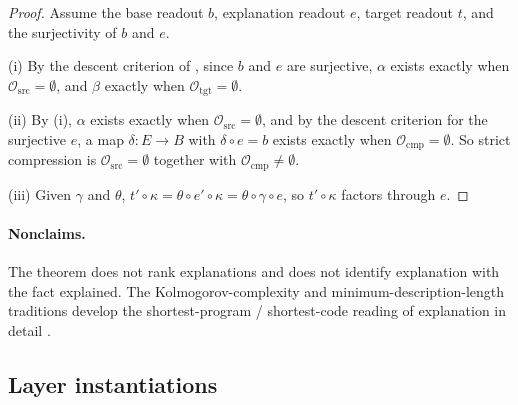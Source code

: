 \begin{proof}
Assume the base readout \(b\), explanation readout \(e\), target
readout \(t\), and the surjectivity of \(b\) and \(e\).

(i) By the descent criterion of , since \(b\) and
\(e\) are surjective, \(\alpha\) exists exactly when
\(\mathcal O_{\mathrm{src}}=\emptyset\), and \(\beta\) exactly when
\(\mathcal O_{\mathrm{tgt}}=\emptyset\).

(ii) By (i), \(\alpha\) exists exactly when
\(\mathcal O_{\mathrm{src}}=\emptyset\), and by the descent criterion for
the surjective \(e\), a map \(\delta:E\to B\) with \(\delta\circ e=b\)
exists exactly when \(\mathcal O_{\mathrm{cmp}}=\emptyset\).  So strict compression is
\(\mathcal O_{\mathrm{src}}=\emptyset\) together with
\(\mathcal O_{\mathrm{cmp}}\ne\emptyset\).

(iii) Given \(\gamma\) and \(\theta\),
\(t'\circ\kappa=\theta\circ e'\circ\kappa=\theta\circ\gamma\circ e\), so
\(t'\circ\kappa\) factors through \(e\).
\end{proof}

\paragraph{Nonclaims.} The theorem does not rank explanations and does not identify
explanation with the fact explained.  The Kolmogorov-complexity and
minimum-description-length traditions develop the
shortest-program / shortest-code reading of explanation in detail
\citep{LiVitanyi2008Kolmogorov}.

\subsection*{Layer instantiations}\label{layer-inst:F30}

